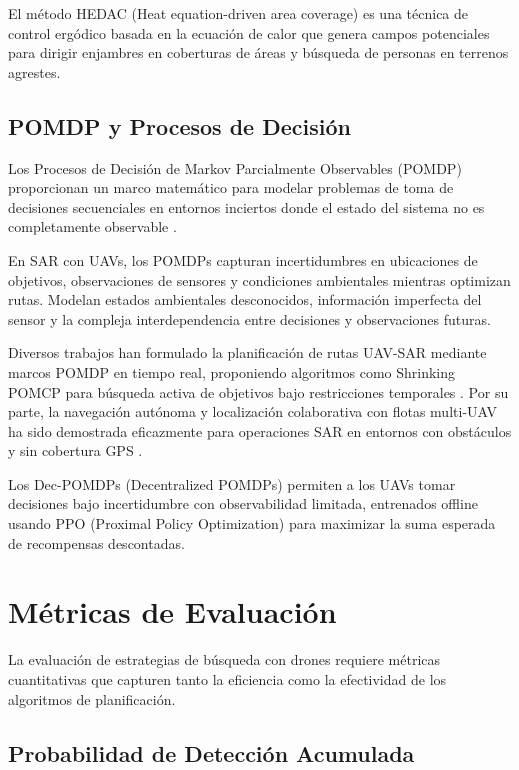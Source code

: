 El método HEDAC (Heat equation-driven area coverage) \cite{hedac2025} es una técnica de control ergódico basada en la ecuación de calor que genera campos potenciales para dirigir enjambres en coberturas de áreas y búsqueda de personas en terrenos agrestes.

\subsection{POMDP y Procesos de Decisión}

Los Procesos de Decisión de Markov Parcialmente Observables (POMDP) proporcionan un marco matemático para modelar problemas de toma de decisiones secuenciales en entornos inciertos donde el estado del sistema no es completamente observable \cite{ragi2018}.

En SAR con UAVs, los POMDPs capturan incertidumbres en ubicaciones de objetivos, observaciones de sensores y condiciones ambientales mientras optimizan rutas. Modelan estados ambientales desconocidos, información imperfecta del sensor y la compleja interdependencia entre decisiones y observaciones futuras.

Diversos trabajos han formulado la planificación de rutas UAV-SAR mediante marcos POMDP en tiempo real, proponiendo algoritmos como Shrinking POMCP para búsqueda activa de objetivos bajo restricciones temporales \cite{zhang2024}. Por su parte, la navegación autónoma y localización colaborativa con flotas multi-UAV ha sido demostrada eficazmente para operaciones SAR en entornos con obstáculos y sin cobertura GPS \cite{sandino2020}.

Los Dec-POMDPs (Decentralized POMDPs) permiten a los UAVs tomar decisiones bajo incertidumbre con observabilidad limitada, entrenados offline usando PPO (Proximal Policy Optimization) para maximizar la suma esperada de recompensas descontadas.

\section{Métricas de Evaluación}

La evaluación de estrategias de búsqueda con drones requiere métricas cuantitativas que capturen tanto la eficiencia como la efectividad de los algoritmos de planificación.

\subsection{Probabilidad de Detección Acumulada}

